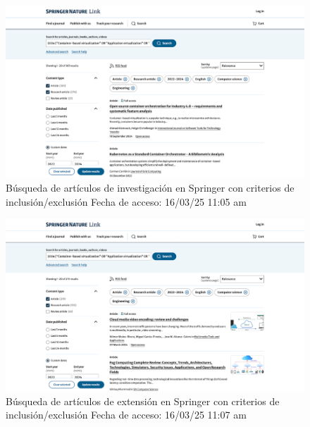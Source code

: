 \FloatBarrier\begin{figure}[htbp]
    \centering
    \includegraphics[width=\textwidth,keepaspectratio]{apendices/BD/criterios/Springer-inv.png}
    \caption{Búsqueda de artículos de investigación en Springer con criterios de inclusión/exclusión
    Fecha de acceso: 16/03/25 11:05 am
    }\label{fig:busqueda23}
\end{figure}
\FloatBarrier\begin{figure}[htbp]
    \centering
    \includegraphics[width=\textwidth,keepaspectratio]{apendices/BD/criterios/Springer-ind.png}
    \caption{Búsqueda de artículos de extensión en Springer con criterios de inclusión/exclusión
    Fecha de acceso: 16/03/25 11:07 am
    }\label{fig:busqueda24}
\end{figure}
